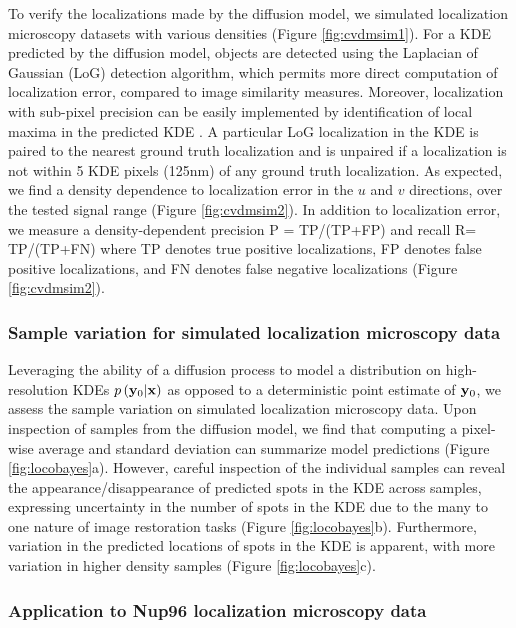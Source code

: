 To verify the localizations made by the diffusion model, we simulated localization microscopy datasets with various densities (Figure \ref{fig:cvdmsim1}). For a KDE predicted by the diffusion model, objects are detected using the Laplacian of Gaussian (LoG) detection algorithm, which permits more direct computation of localization error, compared to image similarity measures. Moreover, localization with sub-pixel precision can be easily implemented by identification of local maxima in the predicted KDE \parencite{Nehme2020}. A particular LoG localization in the KDE is paired to the nearest ground truth localization and is unpaired if a localization is not within 5 KDE pixels (125nm) of any ground truth localization. As expected, we find a density dependence to localization error in the $u$ and $v$ directions, over the tested signal range (Figure \ref{fig:cvdmsim2}). In addition to localization error, we measure a density-dependent precision P = TP/(TP+FP) and recall R= TP/(TP+FN) where TP denotes true positive localizations, FP denotes false positive localizations, and FN denotes false negative localizations (Figure \ref{fig:cvdmsim2}). 

\subsubsection{Sample variation for simulated localization microscopy data}

Leveraging the ability of a diffusion process to model a distribution on high-resolution KDEs $p\left(\bold{y}_0\lvert \bold{x}\right)$ as opposed to a deterministic point estimate of $\bold{y}_0$, we assess the sample variation on simulated localization microscopy data. Upon inspection of samples from the diffusion model, we find that computing a pixel-wise average and standard deviation can summarize model predictions (Figure \ref{fig:locobayes}a). However, careful inspection of the individual samples can reveal the appearance/disappearance of predicted spots in the KDE across samples, expressing uncertainty in the number of spots in the KDE due to the many to one nature of image restoration tasks (Figure \ref{fig:locobayes}b). Furthermore, variation in the predicted locations of spots in the KDE is apparent, with more variation in higher density samples (Figure \ref{fig:locobayes}c). 

\subsubsection{Application to Nup96 localization microscopy data}


